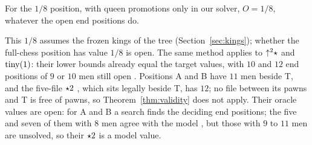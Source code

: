 \begin{proposition}\label{prop:eighth-real}
For the $1/8$ position, with queen promotions only in our solver, $O=1/8$, whatever the open end positions do.
\end{proposition}

This $1/8$ assumes the frozen kings of the tree (Section~\ref{sec:kings}); whether the full-chess position
has value $1/8$ is open. The same method applies to $\mathord{\uparrow^{2}}\star$ and $\operatorname{tiny}(1)$: their lower bounds already equal the
target values, with $10$ and $12$ end positions of $9$ or $10$ men still open . Positions A and B have $11$ men beside
T, and the five-file $\mathord{\star2}$ , which sits legally
beside T, has $12$; no file between its pawns and T is free of pawns, so Theorem~\ref{thm:validity} does not apply. Their oracle values are open: for A and B a
search finds the deciding end positions; the five and seven of them with $8$ men agree with the model
, but those with $9$ to $11$ men are unsolved, so their $\mathord{\star2}$ is a model value.
